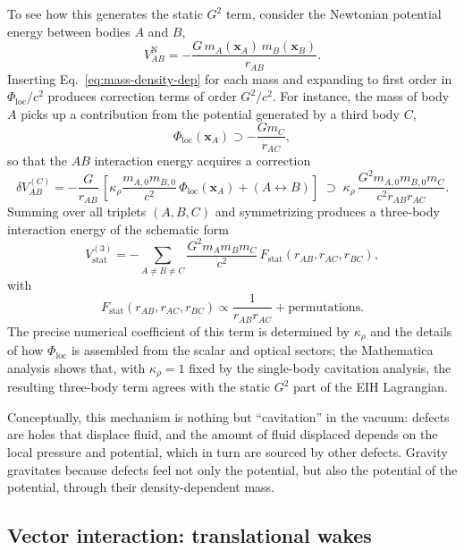 \documentclass[11pt]{article}
\begin{document}
To see how this generates the static $G^2$ term, consider the
Newtonian potential energy between bodies $A$ and $B$,
\begin{equation}
  V_{AB}^{\text{N}}
  = -\frac{G\,m_A(\mathbf{x}_A)\,m_B(\mathbf{x}_B)}{r_{AB}}.
\end{equation}
Inserting Eq.~\eqref{eq:mass-density-dep} for each mass and expanding
to first order in $\Phi_{\text{loc}}/c^2$ produces correction terms of
order $G^2/c^2$.
For instance, the mass of body $A$ picks up a contribution from the
potential generated by a third body $C$,
\begin{equation}
  \Phi_{\text{loc}}(\mathbf{x}_A)
  \supset -\frac{G m_C}{r_{AC}},
\end{equation}
so that the $AB$ interaction energy acquires a correction
\begin{equation}
  \delta V_{AB}^{(C)}
  = -\frac{G}{r_{AB}}\,
    \left[\kappa_\rho \frac{m_{A,0} m_{B,0}}{c^2}\,
          \Phi_{\text{loc}}(\mathbf{x}_A)
          + (A\leftrightarrow B)
    \right]
  \;\supset\;
  \kappa_\rho\,
  \frac{G^2 m_{A,0} m_{B,0} m_C}{c^2 r_{AB} r_{AC}}.
\end{equation}
Summing over all triplets $(A,B,C)$ and symmetrizing produces a
three-body interaction energy of the schematic form
\begin{equation}
  V_{\text{stat}}^{(3)}
  = -\sum_{A\neq B\neq C}
     \frac{G^2 m_A m_B m_C}{c^2}\,
     F_{\text{stat}}(r_{AB},r_{AC},r_{BC}),
\end{equation}
with
\begin{equation}
  F_{\text{stat}}(r_{AB},r_{AC},r_{BC})
  \propto \frac{1}{r_{AB} r_{AC}}
  + \text{permutations}.
\end{equation}
The precise numerical coefficient of this term is determined by
$\kappa_\rho$ and the details of how $\Phi_{\text{loc}}$ is
assembled from the scalar and optical sectors; the Mathematica
analysis shows that, with $\kappa_\rho=1$ fixed by the single-body
cavitation analysis, the resulting three-body term agrees with the
static $G^2$ part of the EIH Lagrangian.

Conceptually, this mechanism is nothing but ``cavitation'' in the
vacuum: defects are holes that displace fluid, and the amount of
fluid displaced depends on the local pressure and potential, which in
turn are sourced by other defects.
Gravity gravitates because defects feel not only the potential, but
also the potential of the potential, through their density-dependent
mass.

\subsection{Vector interaction: translational wakes}
\label{subsec:nbody-vector}
\end{document}
